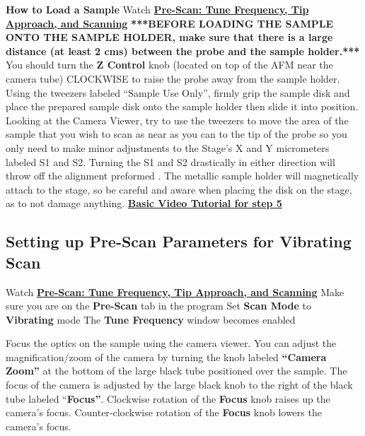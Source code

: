\documentclass{../lab}
\begin{document}
\textbf{How to Load a Sample }
Watch\textbf{ }\href{http://experimentationlab.berkeley.edu/sites/default/files/prescan\_final\_0.mp4}{\textbf{Pre-Scan: Tune Frequency, Tip Approach, and Scanning}}
\textbf{***BEFORE LOADING THE SAMPLE ONTO THE SAMPLE HOLDER, make sure that there is a large distance (at least 2 cms) between the probe and the sample holder.***}  You should turn the \textbf{Z Control }knob (located on top of the AFM near the camera tube) CLOCKWISE to raise the probe away from the sample holder.
Using the tweezers labeled ``Sample Use Only'', firmly grip the sample disk and place the prepared sample disk onto the sample holder then slide it into position.  Looking at the Camera Viewer, try to use the tweezers to move the area of the sample that you wish to scan as near as you can to the tip of the probe so you only need to make minor adjustments to the Stage's X and Y micrometers labeled S1 and S2.  Turning the S1 and S2 drastically in either direction will throw off the alignment preformed\textbf{ }.
The metallic sample holder will magnetically attach to the stage, so be careful and aware when placing the disk on the stage, as to not damage anything.
\href{http://experimentationlab.berkeley.edu/sites/default/files/AFMImages/3.0\%20Sample\%20Exchange\%28V1.0\%29.wmv}{\textbf{Basic Video Tutorial for step 5}}
\textbf{}



\subsection{Setting up Pre-Scan Parameters for Vibrating Scan}
Watch \href{http://experimentationlab.berkeley.edu/sites/default/files/prescan\_final2.mp4}{\textbf{Pre-Scan: Tune Frequency, Tip Approach, and Scanning}}
Make sure you are on the \textbf{Pre-Scan }tab in the program
Set \textbf{Scan Mode} to \textbf{Vibrating }mode
The \textbf{Tune Frequency} window becomes enabled

Focus the optics on the sample using the camera viewer.  You can adjust the magnification/zoom of the camera by turning the knob labeled\textbf{ ``Camera Zoom''} at the bottom of the large black tube positioned over the sample.  The focus of the camera is adjusted by the large black knob to the right of the black tube labeled ``\textbf{Focus''}.
Clockwise rotation of the \textbf{Focus }knob raises up the camera's focus.
Counter-clockwise rotation of the \textbf{Focus }knob lowers the camera's focus.
\end{document}
